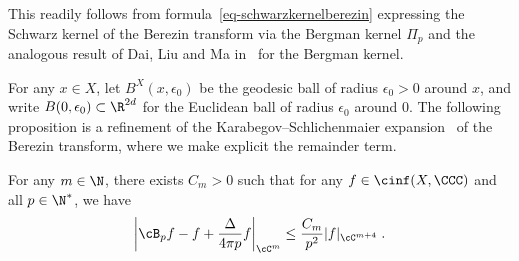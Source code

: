 This readily follows from formula~\eqref{eq-schwarzkernelberezin} expressing the Schwarz kernel of the Berezin transform via the Bergman kernel $\Pi_p$ and the analogous result of Dai, Liu and Ma in~\cite[Theorem~4.18']{DLM06} for the Bergman kernel.

For any $x\in X$, let $B^X(x,\epsilon_0)$ be the geodesic ball of radius $\epsilon_0>0$ around $x$, and write $B(0,\epsilon_0)
\subset\R^{2d}$ for the Euclidean ball of radius $\epsilon_0$ around $0$. The following proposition is a refinement of the Karabegov--Schlichenmaier expansion~\cite[(1.2)]{KS01} of the Berezin transform, where we make explicit the remainder term.

\begin{prop}\label{KS}
For any $m\in\N$, there exists $C_m>0$ such that for any $f\in\cinf(X,\CCC)$ and all $p\in\N^*$, we have
\begin{equation}\label{KSexp}
\left|\cB_pf-f+\frac{\Delta}{4\pi p} f\right|_{\cC^m}\leq
\frac{C_m}{p^2}|f|_{\cC^{m+4}}\;.
\end{equation}
\end{prop}
